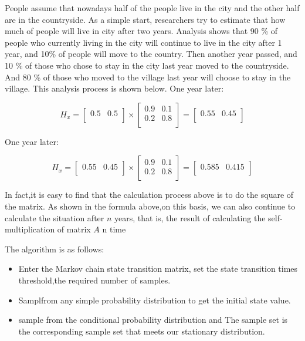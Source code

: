 People assume that nowadays half of the people live in the city and the other half are in the countryside. As a simple start, researchers try to estimate that how much of people will live in city after two years. Analysis shows that 90 \% of people  who currently living in the city will continue to  live in the city after 1 year, and 10\% of people will move to the country. Then another year passed, and 10 \% of those who chose to stay in the city last year moved to the countryside. And 80 \% of those who moved to the village last year will choose to stay in the village. This analysis process is shown  below.
One year later:

$$
H_x=  {
\left[ \begin{array}{ccc}
0.5  & 0.5 \\
\end{array}
\right ]}
\times{
\left[ \begin{array}{ccc}
0.9 & 0.1 \\
0.2 & 0.8\\
\end{array}
\right ]}
=
{
\left[ \begin{array}{ccc}
0.55 & 0.45 \\
\end{array}
\right ]}
$$

One year later:

$$
H_x=  {
\left[ \begin{array}{ccc}
0.55 & 0.45 \\
\end{array}
\right ]}
\times{
\left[ \begin{array}{ccc}
0.9 & 0.1 \\
0.2 & 0.8\\
\end{array}
\right ]}
=
{
\left[ \begin{array}{ccc}
0.585 & 0.415 \\
\end{array}
\right ]}
$$

In fact,it is easy to find that the calculation process above is to do the square of the matrix. As shown in the formula above,on this basis, we can also continue to calculate the situation after $n$ years, that is, the result of calculating the self-multiplication of matrix $A$ n time

The algorithm is as follows:
\begin{itemize}
  \item Enter the Markov chain state transition matrix, set the state transition times threshold,the required number of samples.
  \item Samplfrom any simple probability distribution to get the initial state value.
  \item sample  from the conditional probability distribution and The sample set is the corresponding sample set that meets our stationary distribution.
\end{itemize}


